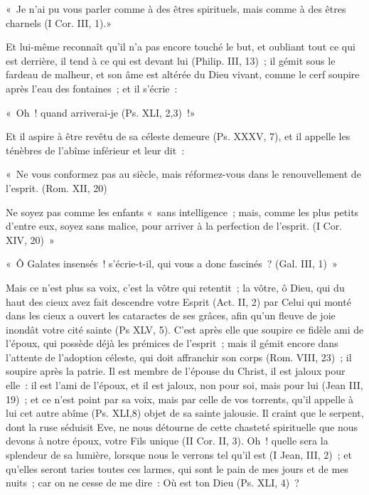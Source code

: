 \documentclass[french,twoside]{book} %
\newenvironment{quoteblock}%
  {\begin{quoting}}
  {\end{quoting}}
\newenvironment{quotebar}{%
    \def\FrameCommand{{\color{rubric!10!}\vrule width 0.5em} \hspace{0.9em}}%
    \def\OuterFrameSep{\itemsep} %
    \MakeFramed {\advance\hsize-\width \FrameRestore}
  }%
  {%
    \endMakeFramed
  }
\renewenvironment{quoteblock}%
  {%
    \savenotes
    \setstretch{0.9}
    \normalfont
    \begin{quotebar}
  }
  {%
    \end{quotebar}
    \spewnotes
  }
\begin{document}
\begin{quoteblock}
\noindent « Je n’ai pu vous parler comme à des êtres spirituels, mais comme à des êtres charnels (I Cor. III, 1).»\end{quoteblock}

\noindent Et lui-même reconnaît qu’il n’a pas encore touché le but, et oubliant tout ce qui est derrière, il tend à ce qui est devant lui (Philip. III, 13) ; il gémit sous le fardeau de malheur, et son âme est altérée du Dieu vivant, comme le cerf soupire après l’eau des fontaines ; et il s’écrie :\par

\begin{quoteblock}
\noindent « Oh ! quand arriverai-je (Ps. XLI, 2,3) !»\end{quoteblock}

\noindent Et il aspire à être revêtu de sa céleste demeure (Ps. XXXV, 7), et il appelle les ténèbres de l’abîme inférieur et leur dit :\par

\begin{quoteblock}
\noindent « Ne vous conformez pas au siècle, mais réformez-vous dans le renouvellement de l’esprit. (Rom. XII, 20)\end{quoteblock}


\begin{quoteblock}
\noindent Ne soyez pas comme les enfants « sans intelligence ; mais, comme les plus petits d’entre eux, soyez sans malice, pour arriver à la perfection de l’esprit. (I Cor. XIV, 20) »\end{quoteblock}


\begin{quoteblock}
\noindent « Ô Galates insensés ! s’écrie-t-il, qui vous a donc fascinés ? (Gal. III, 1) »\end{quoteblock}

\noindent Mais ce n’est plus sa voix, c’est la vôtre qui retentit ; la vôtre, ô Dieu, qui du haut des cieux avez fait descendre votre Esprit (Act. II, 2) par Celui qui monté dans les cieux a ouvert les cataractes de ses grâces, afin qu’un fleuve de joie inondât votre cité sainte (Ps XLV, 5). C’est après elle que soupire ce fidèle ami de l’époux, qui possède déjà les prémices de l’esprit ; mais il gémit encore dans l’attente de l’adoption céleste, qui doit affranchir son corps (Rom. VIII, 23) ; il soupire après la patrie. Il est membre de l’épouse du Christ, il est jaloux pour elle : il est l’ami de l’époux, et il est jaloux, non pour soi, mais pour lui (Jean III, 19) ; et ce n’est point par sa voix, mais par celle de vos torrents, qu’il appelle à lui cet autre abîme (Ps. XLI,8) objet de sa sainte jalousie. Il craint que le serpent, dont la ruse séduisit Eve, ne nous détourne de cette chasteté spirituelle que nous devons à notre époux, votre Fils unique (II Cor. II, 3). Oh ! quelle sera la splendeur de sa lumière, lorsque nous le verrons tel qu’il est (I Jean, III, 2) ; et qu’elles seront taries toutes ces larmes, qui sont le pain de mes jours et de mes nuits ; car on ne cesse de me dire : Où est ton Dieu (Ps. XLI, 4) ?
\end{document}
